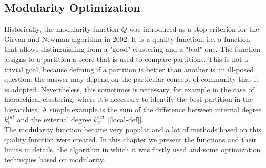 \subsection{Modularity Optimization}
Historically, the modularity function $Q$ was introduced as a stop criterion for the Girvan and Newman algorithm in 2002. It is a quality function, i.e. a function that allows distinguishing from a "good" clustering and a "bad" one. The function assigns to a partition a score that is used to compare partitions. This is not a trivial goal, because defining if a partition is better than another is an ill-posed question: the answer may depend on the particular concept of community that it is adopted. Nevertheless, this sometimes is necessary, for example in the case of hierarchical clustering, where it's necessary to identify the best partition in the hierarchies. A simple example is the sum of the difference between internal degree $k_v^{int}$ and the external degree $k_v^{ext}$ [\ref{local-def}]. \\
The modularity function became very popular and a lot of methods based on this quality function were created.
In this chapter we present the functions and their limits in details, the algorithm in which it was firstly used and some optimization techniques based on modularity.
